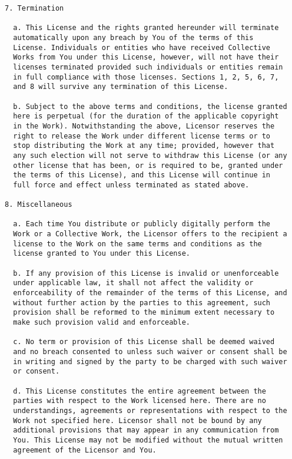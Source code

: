 \begin{Verbatim}[fontsize=\footnotesize]
7. Termination

  a. This License and the rights granted hereunder will terminate
  automatically upon any breach by You of the terms of this
  License. Individuals or entities who have received Collective
  Works from You under this License, however, will not have their
  licenses terminated provided such individuals or entities remain
  in full compliance with those licenses. Sections 1, 2, 5, 6, 7,
  and 8 will survive any termination of this License.
  
  b. Subject to the above terms and conditions, the license granted
  here is perpetual (for the duration of the applicable copyright
  in the Work). Notwithstanding the above, Licensor reserves the
  right to release the Work under different license terms or to
  stop distributing the Work at any time; provided, however that
  any such election will not serve to withdraw this License (or any
  other license that has been, or is required to be, granted under
  the terms of this License), and this License will continue in
  full force and effect unless terminated as stated above.

8. Miscellaneous

  a. Each time You distribute or publicly digitally perform the
  Work or a Collective Work, the Licensor offers to the recipient a
  license to the Work on the same terms and conditions as the
  license granted to You under this License.

  b. If any provision of this License is invalid or unenforceable
  under applicable law, it shall not affect the validity or
  enforceability of the remainder of the terms of this License, and
  without further action by the parties to this agreement, such
  provision shall be reformed to the minimum extent necessary to
  make such provision valid and enforceable.
  
  c. No term or provision of this License shall be deemed waived
  and no breach consented to unless such waiver or consent shall be
  in writing and signed by the party to be charged with such waiver
  or consent.
  
  d. This License constitutes the entire agreement between the
  parties with respect to the Work licensed here. There are no
  understandings, agreements or representations with respect to the
  Work not specified here. Licensor shall not be bound by any
  additional provisions that may appear in any communication from
  You. This License may not be modified without the mutual written
  agreement of the Licensor and You.

\end{Verbatim}

